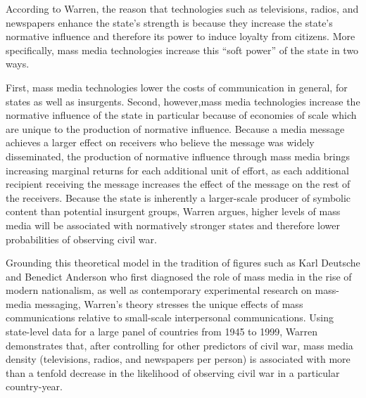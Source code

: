 \documentclass[11pt,article,oneside]{memoir}
\begin{document}
According to Warren, the reason that technologies such as televisions,
radios, and newspapers enhance the state's strength is because they
increase the state's normative influence and therefore its power to
induce loyalty from citizens. More specifically, mass media technologies
increase this ``soft power'' of the state in two ways.

First, mass media technologies lower the costs of communication in
general, for states as well as insurgents. Second, however,mass media
technologies increase the normative influence of the state in particular
because of economies of scale which are unique to the production of
normative influence. Because a media message achieves a larger effect on
receivers who believe the message was widely disseminated, the
production of normative influence through mass media brings increasing
marginal returns for each additional unit of effort, as each additional
recipient receiving the message increases the effect of the message on
the rest of the receivers. Because the state is inherently a
larger-scale producer of symbolic content than potential insurgent
groups, Warren argues, higher levels of mass media will be associated
with normatively stronger states and therefore lower probabilities of
observing civil war.

Grounding this theoretical model in the tradition of figures such as
Karl Deutsche and Benedict Anderson who first diagnosed the role of mass
media in the rise of modern nationalism, as well as contemporary
experimental research on mass-media messaging, Warren's theory stresses
the unique effects of mass communications relative to small-scale
interpersonal communications. Using state-level data for a large panel
of countries from 1945 to 1999, Warren demonstrates that, after
controlling for other predictors of civil war, mass media density
(televisions, radios, and newspapers per person) is associated with more
than a tenfold decrease in the likelihood of observing civil war in a
particular country-year.
\end{document}
